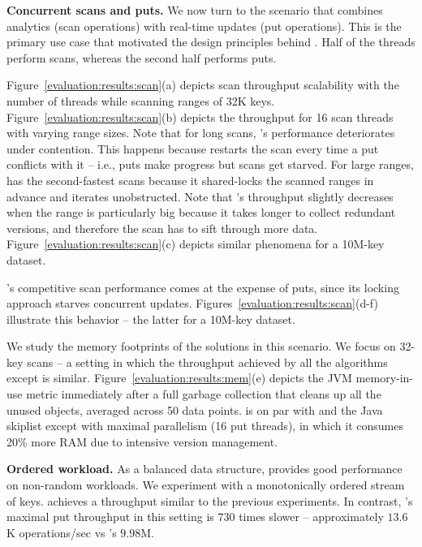 \textbf{Concurrent scans and puts.}
We now turn to the scenario that combines analytics (scan operations) with 
real-time updates (put operations). This is the primary use case that motivated 
the design principles behind {\kiwi}. Half of the threads perform scans, whereas 
the second half performs puts. 

Figure~\ref{evaluation:results:scan}(a) depicts scan throughput scalability with the number of threads
while scanning ranges of 32K keys. Figure~\ref{evaluation:results:scan}(b) depicts the throughput for 16 scan 
threads with varying range sizes. Note that for long scans, {\kary}'s performance deteriorates under contention. 
This happens because {\kary} restarts the scan every time a put conflicts with it -- i.e., puts make progress 
but scans get starved. For large ranges, {\snaptree} has the second-fastest scans because it shared-locks 
the scanned ranges in advance and iterates unobstructed. 
{\color{red} Note that {\kiwi}'s throughput slightly decreases when the range is particularly big 
because it takes longer to collect redundant versions, and therefore the scan has to sift through 
more data. Figure~\ref{evaluation:results:scan}(c) depicts similar phenomena for a 10M-key dataset.}

{\snaptree}'s competitive scan performance comes at the expense of puts, 
since its locking approach starves concurrent updates. Figures~\ref{evaluation:results:scan}(d-f) 
 illustrate this behavior {\color{red}-- the latter for a 10M-key dataset}.

We study the memory footprints of the solutions in this scenario. We focus on 32-key scans -- a setting 
in which the throughput achieved by all the algorithms except {\snaptree} is similar.  
Figure~\ref{evaluation:results:mem}(e) depicts the JVM memory-in-use metric immediately after a full 
garbage collection that cleans up all the unused objects, averaged across 50 data points. 
{\kiwi} is on par with {\kary} and the Java skiplist except with maximal parallelism (16 put threads), 
in which it consumes 20\% more RAM due to intensive version management.  


\textbf{Ordered workload.} 
As a balanced data structure, {\kiwi} provides good performance on non-random workloads. 
We experiment with a monotonically ordered stream of keys. {\kiwi} achieves a throughput 
similar to the previous experiments. In contrast, {\kary}'s maximal put throughput in this setting is 
730 times slower -- approximately $13.6$K operations/sec vs {\kiwi}'s $9.98$M. 
